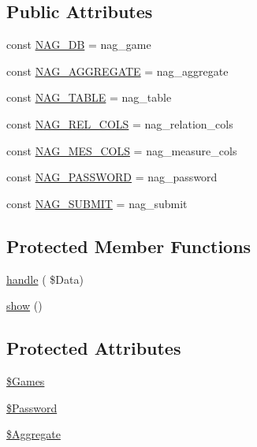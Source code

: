 \subsection*{Public Attributes}
\begin{DoxyCompactItemize}
\item 
const \hyperlink{class_page_new_aggregate_a279ad886b303a2198d9227947936b918}{N\+A\+G\+\_\+\+DB} = \textquotesingle{}nag\+\_\+game\textquotesingle{}
\item 
const \hyperlink{class_page_new_aggregate_a7971f4f14556c1104cc2b189d397dd7c}{N\+A\+G\+\_\+\+A\+G\+G\+R\+E\+G\+A\+TE} = \textquotesingle{}nag\+\_\+aggregate\textquotesingle{}
\item 
const \hyperlink{class_page_new_aggregate_a4a670c16104e4a94f3bbf785d6c82c21}{N\+A\+G\+\_\+\+T\+A\+B\+LE} = \textquotesingle{}nag\+\_\+table\textquotesingle{}
\item 
const \hyperlink{class_page_new_aggregate_ab4903f5ccdf515e372289eddd5c908f3}{N\+A\+G\+\_\+\+R\+E\+L\+\_\+\+C\+O\+LS} = \textquotesingle{}nag\+\_\+relation\+\_\+cols\textquotesingle{}
\item 
const \hyperlink{class_page_new_aggregate_aaeeaaff521d49b1f1117bdad17812fe0}{N\+A\+G\+\_\+\+M\+E\+S\+\_\+\+C\+O\+LS} = \textquotesingle{}nag\+\_\+measure\+\_\+cols\textquotesingle{}
\item 
const \hyperlink{class_page_new_aggregate_ab4fa26a45eaa9be62f65a269877436d2}{N\+A\+G\+\_\+\+P\+A\+S\+S\+W\+O\+RD} = \textquotesingle{}nag\+\_\+password\textquotesingle{}
\item 
const \hyperlink{class_page_new_aggregate_a9d233c16f3f66f98007fafe0623351e4}{N\+A\+G\+\_\+\+S\+U\+B\+M\+IT} = \textquotesingle{}nag\+\_\+submit\textquotesingle{}
\end{DoxyCompactItemize}
\subsection*{Protected Member Functions}
\begin{DoxyCompactItemize}
\item 
\hyperlink{class_page_new_aggregate_a5ceaf2dbf2a63f97181ae557f50908e4}{handle} ( \$Data)
\item 
\hyperlink{class_page_new_aggregate_ae12848a7d266fbce4b447698cfc5f4df}{show} ()
\end{DoxyCompactItemize}
\subsection*{Protected Attributes}
\begin{DoxyCompactItemize}
\item 
\hyperlink{class_page_new_aggregate_a14491dae16368151654d5ef15162aff5}{\$\+Games}
\item 
\hyperlink{class_page_new_aggregate_a84a797e76cf49511e6947a5ac8ff5006}{\$\+Password}
\item 
\hyperlink{class_page_new_aggregate_ad3a0845a89817c687ad7b235810167a7}{\$\+Aggregate}
\end{DoxyCompactItemize}


